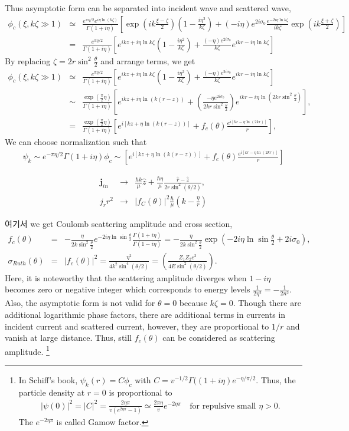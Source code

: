 \documentclass[10pt]{book}
\def\bm{\boldsymbol}
\newcommand{\bea}{\begin{eqnarray}}
\newcommand{\eea}{\end{eqnarray}}
\newcommand{\no}{\nonumber \\}
\begin{document}
Thus asymptotic form can be separated into incident wave and scattered wave,
\bea
\phi_c(\xi,k\zeta\gg 1) &\simeq& \frac{e^{\pi\eta/2}e^{i\eta\ln(k\zeta)}}{\Gamma(1+i\eta)}
  \left[ \exp(ik\frac{\xi-\zeta}{2})(1-\frac{i\eta^2}{k\zeta})
        +(-i\eta)e^{2i\sigma_0}\frac{e^{-2i\eta\ln k\zeta }}{ik\zeta}
         \exp(ik\frac{\xi+\zeta}{2})
  \right] \no  
&=&\frac{e^{\pi\eta/2}}{\Gamma(1+i\eta)}
  \left[ e^{ikz+i\eta\ln k\zeta}(1-\frac{i\eta^2}{k\zeta})
        +\frac{(-\eta)e^{2i\sigma_0}}{k\zeta} e^{ikr-i\eta\ln k\zeta }
  \right]
\eea 
By replacing $\zeta=2r\sin^2\frac{\theta}{2}$ and 
arrange terms, we get
\bea     
\phi_c(\xi,k\zeta\gg 1)&\simeq& \frac{e^{\pi\eta/2}}{\Gamma(1+i\eta)}
  \left[ e^{ikz+i\eta\ln k\zeta}(1-\frac{i\eta^2}{k\zeta})
        +\frac{(-\eta)e^{2i\sigma_0}}{k\zeta} e^{ikr-i\eta\ln k\zeta }
  \right] \no 
&\sim&
 \frac{\exp(\frac{\pi}{2}\eta)}{\Gamma(1+i\eta)}
 \left[ e^{ikz+i\eta\ln (k(r-z))}
      +\left(\frac{-\eta e^{2i\sigma_0}}{2kr\sin^2\frac{\theta}{2} }  \right)  
      e^{ikr-i\eta\ln (2kr\sin^2\frac{\theta}{2}) }\right],\no
 &=&\frac{\exp(\frac{\pi}{2}\eta)}{\Gamma(1+i\eta)}
  \left[ e^{ i[kz +\eta\ln (k(r-z))]}
        +f_c(\theta)\frac{e^{i[kr-\eta\ln(2kr)]} }{r} 
  \right],
\eea 
We can choose normalization such that
\bea 
\psi_k\sim e^{-\pi\eta/2}\Gamma(1+i\eta)\phi_c \sim \left[ e^{ i[kz +\eta\ln (k(r-z))]}
        +f_c(\theta)\frac{e^{i[kr-\eta\ln(2kr)]} }{r} 
  \right]
\eea 

\bea 
{\bm j}_{in}&\to& \frac{\hbar k}{\mu}\hat{z}
          +\frac{\hbar\eta}{\mu}\frac{\hat{r}-\hat{z}}{2r\sin^2(\theta/2)},\no 
j_r r^2 &\to& |f_C(\theta)|^2\frac{\hbar}{\mu}\left(k - \frac{\eta}{r}\right)  
\eea 

여기서 we get Coulomb scattering amplitude and cross section,
\bea   
f_c(\theta)&=&-\frac{\eta}{2k \sin^2\frac{\theta}{2}}
              e^{-2i\eta \ln\sin\frac{\theta}{2}}\frac{\Gamma(1+i\eta)}{\Gamma(1-i\eta)}
            =-\frac{\eta}{2k \sin^2\frac{\theta}{2}}
              \exp(-2i\eta \ln\sin\frac{\theta}{2}+2i\sigma_0)
              ,\no  
\sigma_{Ruth}(\theta)&=&|f_c(\theta)|^2
       =\frac{\eta^2}{4 k^2\sin^4(\theta/2)}=\left(\frac{Z_1 Z_2 e^2}{4 E\sin^2(\theta/2)} \right) .
\eea
Here, it is noteworthy that the scattering amplitude diverges 
when $1-i\eta$ becomes zero or negative integer which corresponds to
energy levels $\frac{1}{2\eta^2}=-\frac{1}{2n^2}$. 
Also, the asymptotic form is not valid for $\theta=0$ because $k\zeta=0$.
Though there are additional logarithmic phase factors, 
there are additional terms in currents in incident current and scattered
current, however, they are proportional to $1/r$ and vanish at large distance.
Thus, still $f_c(\theta)$ can be considered as scattering amplitude.
\footnote{In Schiff's book, $\psi_k(r)=C \phi_c$ with $C=v^{-1/2}\Gamma((1+i\eta)e^{-\eta/\pi/2}$.
Thus, the particle density at $r=0$ is proportional to
\bea 
|\psi(0)|^2=|C|^2=\frac{2\eta\pi}{v(e^{2\eta\pi}-1)}\simeq \frac{2\pi\eta}{v}e^{-2\eta\pi}\quad \mbox{for repulsive small } \eta > 0.
\eea 
The $e^{-2\eta\pi}$ is called Gamow factor.
} 
\end{document}

